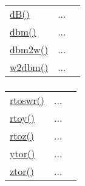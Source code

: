 \textcolor{blue}{}\begin{tabular}{>{\raggedleft}p{3cm}>{\centering}p{0.5cm}l}
\textcolor{blue}{\hyperlink{dB}{dB()}}&
...&
 \begin{NoHyper} \nameref{par:dB} \end{NoHyper}\tabularnewline
\textcolor{blue}{\hyperlink{dbm}{dbm()}}&
...&
 \begin{NoHyper} \nameref{par:dbm} \end{NoHyper}\tabularnewline
\textcolor{blue}{\hyperlink{dbm2w}{dbm2w()}}&
...&
 \begin{NoHyper} \nameref{par:dbm2w} \end{NoHyper}\tabularnewline
\textcolor{blue}{\hyperlink{w2dbm}{w2dbm()}}&
...&
 \begin{NoHyper} \nameref{par:w2dbm} \end{NoHyper}\tabularnewline
\end{tabular}


\subsubsection*{}

\textcolor{blue}{}\begin{tabular}{>{\raggedleft}p{3cm}>{\centering}p{0.5cm}l}
\textcolor{blue}{\hyperlink{rtoswr}{rtoswr()}}&
...&
 \begin{NoHyper} \nameref{par:rtoswr} \end{NoHyper}\tabularnewline
\textcolor{blue}{\hyperlink{rtoy}{rtoy()}}&
...&
 \begin{NoHyper} \nameref{par:rtoy} \end{NoHyper}\tabularnewline
\textcolor{blue}{\hyperlink{rtoz}{rtoz()}}&
...&
 \begin{NoHyper} \nameref{par:rtoz} \end{NoHyper}\tabularnewline
\textcolor{blue}{\hyperlink{ytor}{ytor()}}&
...&
 \begin{NoHyper} \nameref{par:ytor} \end{NoHyper}\tabularnewline
\textcolor{blue}{\hyperlink{ztor}{ztor()}}&
...&
 \begin{NoHyper} \nameref{par:ztor} \end{NoHyper}\tabularnewline
\end{tabular}


\subsubsection*{}

